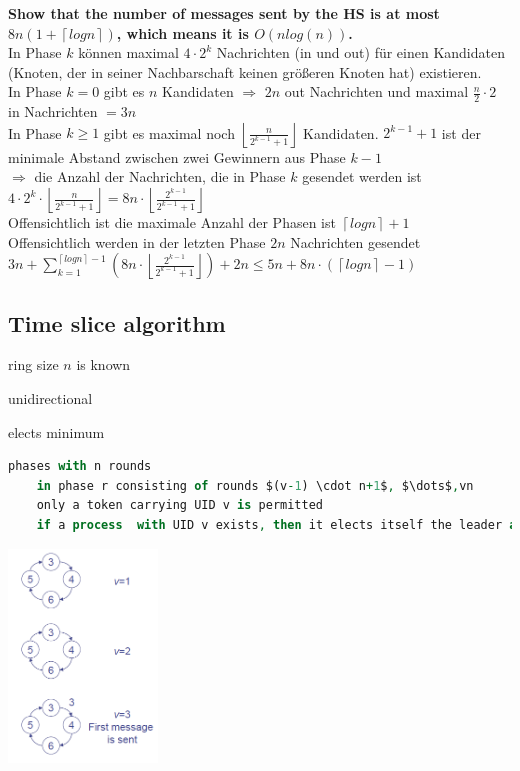 \textbf{Show that the number of messages sent by the HS is at most $8n(1+\left\lceil logn\right\rceil )$, which means it is $O(nlog(n))$.}\\ 
In Phase $k$ können maximal $4\cdot2^{k}$ Nachrichten (in und out) für einen Kandidaten (Knoten, der in seiner Nachbarschaft keinen größeren Knoten hat) existieren.\\
In Phase $k=0$ gibt es $n$ Kandidaten $\Rightarrow$ $2n$ out Nachrichten und maximal $\frac{n}{2}\cdot2$ in Nachrichten $=3n$\\
In Phase $k\geq1$ gibt es maximal noch $\left\lfloor \frac{n}{2^{k-1}+1}\right\rfloor $ Kandidaten. $2^{k-1}+1$ ist der minimale Abstand zwischen zwei Gewinnern aus Phase $k-1$\\ $\Rightarrow$ die Anzahl der Nachrichten, die in Phase $k$ gesendet werden ist $4\cdot2^{k}\cdot\left\lfloor \frac{n}{2^{k-1}+1}\right\rfloor =8n\cdot\left\lfloor \frac{2^{k-1}}{2^{k-1}+1}\right\rfloor $\\ 
Offensichtlich ist die maximale Anzahl der Phasen ist $\left\lceil logn\right\rceil +1$\\
Offensichtlich werden in der letzten Phase $2n$ Nachrichten gesendet\\
$3n+\sum\limits _{k=1}^{\left\lceil logn\right\rceil -1}\left(8n\cdot\left\lfloor \frac{2^{k-1}}{2^{k-1}+1}\right\rfloor \right)+2n\leq5n+8n\cdot\left(\left\lceil logn\right\rceil -1\right)$ 


\subsection{Time slice algorithm}
\begin{compactitem}
\item ring size $n$ is known
\item unidirectional
\item elects minimum
\end{compactitem}


\begin{lstlisting}[mathescape, language=VHDL]
	phases with n rounds
	in phase r consisting of rounds $(v-1) \cdot n+1$, $\dots$,vn
	only a token carrying UID v is permitted
	if a process  with UID v exists, then it elects itself the leader and sends a token with it's UID
\end{lstlisting}

\begin{minipage}{\linewidth}
	\centering\includegraphics[width=150px]{gfx/timeslice.png}
	\label{img:timeslice}
\end{minipage}

